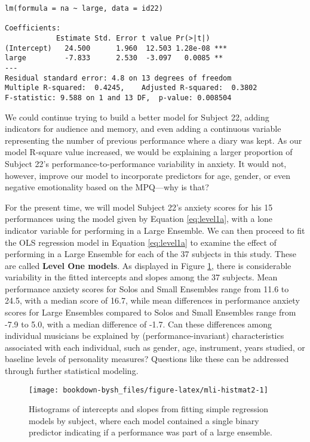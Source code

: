 \documentclass[
]{krantz}
\begin{document}
\begin{verbatim}
lm(formula = na ~ large, data = id22)

Coefficients:
            Estimate Std. Error t value Pr(>|t|)    
(Intercept)   24.500      1.960  12.503 1.28e-08 ***
large         -7.833      2.530  -3.097   0.0085 ** 
---
Residual standard error: 4.8 on 13 degrees of freedom
Multiple R-squared:  0.4245,    Adjusted R-squared:  0.3802 
F-statistic: 9.588 on 1 and 13 DF,  p-value: 0.008504
\end{verbatim}

We could continue trying to build a better model for Subject 22, adding indicators for audience and memory, and even adding a continuous variable representing the number of previous performance where a diary was kept. As our model R-square value increased, we would be explaining a larger proportion of Subject 22's performance-to-performance variability in anxiety. It would not, however, improve our model to incorporate predictors for age, gender, or even negative emotionality based on the MPQ---why is that?

For the present time, we will model Subject 22's anxiety scores for his 15 performances using the model given by Equation \eqref{eq:level1a}, with a lone indicator variable for performing in a Large Ensemble. We can then proceed to fit the OLS regression model in Equation \eqref{eq:level1a} to examine the effect of performing in a Large Ensemble for each of the 37 subjects in this study. These are called \textbf{Level One models}. As displayed in Figure \ref{fig:mli-histmat2}, there is considerable variability in the fitted intercepts and slopes among the 37 subjects. Mean performance anxiety scores for Solos and Small Ensembles range from 11.6 to 24.5, with a median score of 16.7, while mean differences in performance anxiety scores for Large Ensembles compared to Solos and Small Ensembles range from -7.9 to 5.0, with a median difference of -1.7. Can these differences among individual musicians be explained by (performance-invariant) characteristics associated with each individual, such as gender, age, instrument, years studied, or baseline levels of personality measures? Questions like these can be addressed through further statistical modeling.

\begin{figure}

{\centering \texttt{[image: bookdown-bysh\_files/figure-latex/mli-histmat2-1]} 

}

\caption{Histograms of intercepts and slopes from fitting simple regression models by subject, where each model contained a single binary predictor indicating if a performance was part of a large ensemble.}\label{fig:mli-histmat2}
\end{figure}
\end{document}
